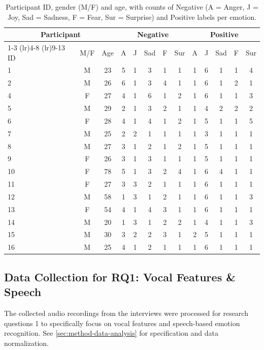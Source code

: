 \begin{table}[H]
  \centering
  \begin{tabular}{@{} 
      l  c  c   
      *{5}{c}   
      *{5}{c}   
    @{}}
    \toprule
    \multicolumn{3}{c}{Participant} 
      & \multicolumn{5}{c}{Negative} 
      & \multicolumn{5}{c}{Positive} \\
    \cmidrule(lr){1-3} \cmidrule(lr){4-8} \cmidrule(lr){9-13}
    ID & M/F & Age 
      & A & J & Sad & F & Sur 
      & A & J & Sad & F & Sur \\
    \midrule
    1  & M & 23 & 5 & 1 & 3 & 1 & 1 & 1 & 6 & 1 & 1 & 4 \\
    2  & M & 26 & 6 & 1 & 3 & 4 & 1 & 1 & 6 & 1 & 2 & 1 \\
    4  & F & 27 & 4 & 1 & 6 & 1 & 2 & 1 & 6 & 1 & 1 & 3 \\
    5  & M & 29 & 2 & 1 & 3 & 2 & 1 & 1 & 4 & 2 & 2 & 2 \\
    6  & F & 28 & 4 & 1 & 4 & 1 & 2 & 1 & 5 & 1 & 1 & 5 \\
    7  & M & 25 & 2 & 2 & 1 & 1 & 1 & 1 & 3 & 1 & 1 & 1 \\
    8  & M & 27 & 3 & 1 & 2 & 1 & 2 & 1 & 5 & 1 & 1 & 1 \\
    9  & F & 26 & 3 & 1 & 3 & 1 & 1 & 1 & 5 & 1 & 1 & 1 \\
    10 & F & 78 & 5 & 1 & 3 & 2 & 4 & 1 & 6 & 4 & 1 & 1 \\
    11 & F & 27 & 3 & 3 & 2 & 1 & 1 & 1 & 6 & 1 & 1 & 1 \\
    12 & M & 58 & 1 & 3 & 1 & 2 & 1 & 1 & 6 & 1 & 1 & 3 \\
    13 & F & 54 & 4 & 1 & 4 & 3 & 1 & 1 & 6 & 1 & 1 & 1 \\
    14 & M & 20 & 1 & 3 & 1 & 2 & 2 & 1 & 4 & 1 & 1 & 3 \\
    15 & M & 30 & 3 & 2 & 2 & 3 & 1 & 2 & 5 & 1 & 1 & 1 \\
    16 & M & 25 & 4 & 1 & 2 & 1 & 1 & 1 & 6 & 1 & 1 & 1 \\
    \bottomrule
  \end{tabular}
  \caption{Participant ID, gender (M/F) and age, with counts of Negative (A = Anger, J = Joy, Sad = Sadness, F = Fear, Sur = Surprise) and Positive labels per emotion.}
  \label{tab:interview_table}
\end{table}

\subsection{Data Collection for RQ1: Vocal Features \& Speech}
The collected audio recordings from the interviews were processed for research questions 1 to specifically focus on vocal features and speech-based emotion recognition. 
See \ref{sec:method-data-analysis} for specification and data normalization. 

